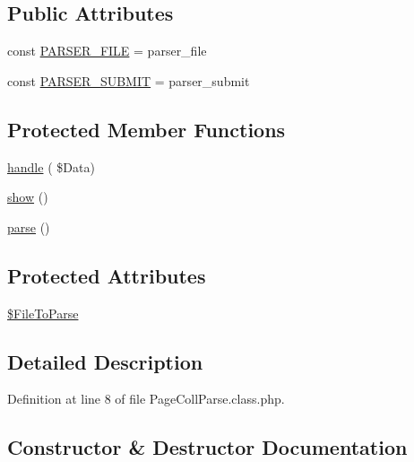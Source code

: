 \subsection*{Public Attributes}
\begin{DoxyCompactItemize}
\item 
const \hyperlink{class_page_coll_parse_a0712b2bda5bac9073fd5d73ae75d9b45}{P\+A\+R\+S\+E\+R\+\_\+\+F\+I\+LE} = \textquotesingle{}parser\+\_\+file\textquotesingle{}
\item 
const \hyperlink{class_page_coll_parse_a40bfd3341471b7fd8ae6a910b4a24bf5}{P\+A\+R\+S\+E\+R\+\_\+\+S\+U\+B\+M\+IT} = \textquotesingle{}parser\+\_\+submit\textquotesingle{}
\end{DoxyCompactItemize}
\subsection*{Protected Member Functions}
\begin{DoxyCompactItemize}
\item 
\hyperlink{class_page_coll_parse_a820526f8ea9a75f90ee25057bb7d072a}{handle} ( \$Data)
\item 
\hyperlink{class_page_coll_parse_a599391c515aee215dbd1d433c69837b7}{show} ()
\item 
\hyperlink{class_page_coll_parse_a1c597aac0c341568337b177194428178}{parse} ()
\end{DoxyCompactItemize}
\subsection*{Protected Attributes}
\begin{DoxyCompactItemize}
\item 
\hyperlink{class_page_coll_parse_a05cf2d8d8ec1ac13f83d5415aa65a100}{\$\+File\+To\+Parse}
\end{DoxyCompactItemize}


\subsection{Detailed Description}


Definition at line 8 of file Page\+Coll\+Parse.\+class.\+php.



\subsection{Constructor \& Destructor Documentation}
\mbox{\label{class_page_coll_parse_a5a6465bed563b202301f5cbc6aff4d6b}} 
